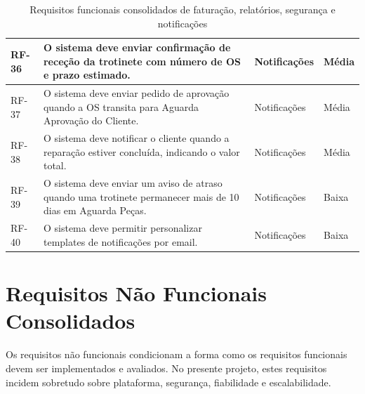 \documentclass[a4paper,12pt]{scrreprt}
\begin{document}
\begin{table}[H]
\begin{tabular}{|p{1.4cm}|p{8.9cm}|p{2.5cm}|p{2.1cm}|}
                \hline
                RF-36 & O sistema deve enviar confirmação de receção da trotinete com número de OS e prazo estimado. & Notificações & Média \\
                \hline
                RF-37 & O sistema deve enviar pedido de aprovação quando a OS transita para Aguarda Aprovação do Cliente. & Notificações & Média \\
                \hline
                RF-38 & O sistema deve notificar o cliente quando a reparação estiver concluída, indicando o valor total. & Notificações & Média \\
                \hline
                RF-39 & O sistema deve enviar um aviso de atraso quando uma trotinete permanecer mais de 10 dias em Aguarda Peças. & Notificações & Baixa \\
                \hline
                RF-40 & O sistema deve permitir personalizar templates de notificações por email. & Notificações & Baixa \\
                \hline
            \end{tabular}
            \caption{Requisitos funcionais consolidados de faturação, relatórios, segurança e notificações}
        \end{table}

    \section{Requisitos Não Funcionais Consolidados}
        Os requisitos não funcionais condicionam a forma como os requisitos funcionais devem ser implementados e avaliados. No presente projeto, estes requisitos incidem sobretudo sobre plataforma, segurança, fiabilidade e escalabilidade.
\end{document}
